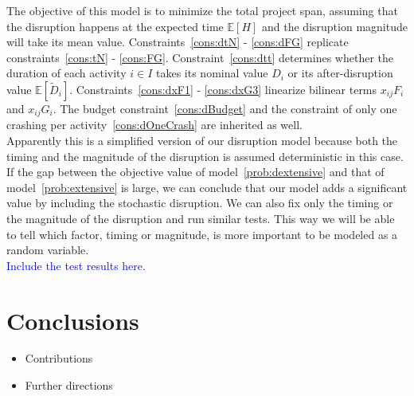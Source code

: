 \documentclass[11pt]{article}
\newcommand{\E}{{\mathbb E}}
\begin{document}
		The objective of this model is to minimize the total project span, assuming that the disruption happens at the expected time \(\E[H]\) and the disruption magnitude will take its mean value. Constraints~\eqref{cons:dtN} - \eqref{cons:dFG} replicate constraints~\eqref{cons:tN} - \eqref{cons:FG}. Constraint~\eqref{cons:dtt} determines whether the duration of each activity \(i \in I\) takes its nominal value \(D_i\) or its after-disruption value \(\E[\tilde{D}_i]\). Constraints~\eqref{cons:dxF1} - \eqref{cons:dxG3} linearize bilinear terms \(x_{ij} F_i\) and \(x_{ij}G_i\). The budget constraint~\eqref{cons:dBudget} and the constraint of only one crashing per activity~\eqref{cons:dOneCrash} are inherited as well. \\
		\newline 
		Apparently this is a simplified version of our disruption model because both the timing and the magnitude of the disruption is assumed deterministic in this case. If the gap between the objective value of model~\eqref{prob:dextensive} and that of model~\eqref{prob:extensive} is large, we can conclude that our model adds a significant value by including the stochastic disruption. We can also fix only the timing or the magnitude of the disruption and run similar tests. This way we will be able to tell which factor, timing or magnitude, is more important to be modeled as a random variable.\\
		\newline
		\textcolor{blue}{Include the test results here.}

\section{Conclusions} \label{sec:conclusions}
	\begin{itemize}
		\item Contributions
		\item Further directions
	\end{itemize}



\end{document}
